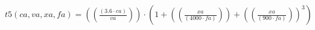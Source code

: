 \documentclass[preview,border=1pt]{standalone}
\begin{document}
$
t5 (ca,va,xa,fa) = \left(\left(\frac{\left(\num{3.6}\cdot ca\right)}{va}\right)\right)\cdot \left(\num{1}+\left(\left(\frac{xa}{\left(\num{4000}\cdot fa\right)}\right)\right)+\left(\left(\frac{xa}{\left(\num{900}\cdot fa\right)}\right)\right)^{\num{3}}\right)
$
\end{document}
